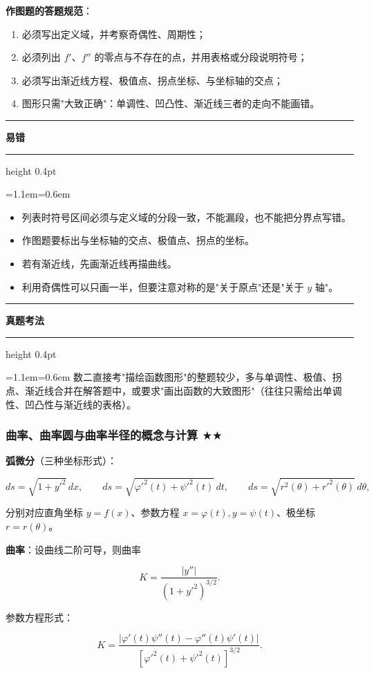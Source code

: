 \documentclass[11pt,openany,UTF8]{ctexbook}
\newcommand{\callouthead}[2]{%
  \par\addvspace{7pt}\noindent
  {\color{#1}\rule[-0.15em]{3pt}{1.05em}}\hspace{0.5em}%
  {\bfseries\color{#1}#2}\par\nobreak\vspace{-0.35em}%
  {\color{rulesep}\hrule height 0.4pt}\nobreak\vspace{0.45em}%
  \begingroup\small\setlength{\parindent}{0pt}%
  \leftskip=1.1em\rightskip=0.6em\noindent\ignorespaces}
\newcommand{\calloutend}{\par\endgroup\addvspace{7pt}}
\newenvironment{callwarn}[1]{\callouthead{warnbar}{#1}}{\calloutend}
\newenvironment{callexam}[1]{\callouthead{exambar}{#1}}{\calloutend}
\begin{document}
\textbf{作图题的答题规范}：

\begin{enumerate}
\item 必须写出定义域，并考察奇偶性、周期性；
\item 必须列出 $f'$、$f''$ 的零点与不存在的点，并用表格或分段说明符号；
\item 必须写出渐近线方程、极值点、拐点坐标、与坐标轴的交点；
\item 图形只需"大致正确"：单调性、凹凸性、渐近线三者的走向不能画错。
\end{enumerate}
\begin{callwarn}{易错}
\begin{itemize}
\item 列表时符号区间必须与定义域的分段一致，不能漏段，也不能把分界点写错。
\item 作图题要标出与坐标轴的交点、极值点、拐点的坐标。
\item 若有渐近线，先画渐近线再描曲线。
\item 利用奇偶性可以只画一半，但要注意对称的是"关于原点"还是"关于 $y$ 轴"。
\end{itemize}
\end{callwarn}

\begin{callexam}{真题考法}
数二直接考"描绘函数图形"的整题较少，多与单调性、极值、拐点、渐近线合并在解答题中，或要求"画出函数的大致图形"（往往只需给出单调性、凹凸性与渐近线的表格）。

\end{callexam}

\subsubsection{曲率、曲率圆与曲率半径的概念与计算 $\bigstar$$\bigstar$}

\textbf{弧微分}（三种坐标形式）：

\[ds=\sqrt{1+y'^2}\,dx,\qquad
ds=\sqrt{\varphi'^2(t)+\psi'^2(t)}\,dt,\qquad
ds=\sqrt{r^2(\theta)+r'^2(\theta)}\,d\theta,\]

分别对应直角坐标 $y=f(x)$、参数方程 $x=\varphi(t),y=\psi(t)$、极坐标 $r=r(\theta)$。

\textbf{曲率}：设曲线二阶可导，则曲率

\[K=\frac{|y''|}{\left(1+y'^2\right)^{3/2}}.\]

参数方程形式：

\[K=\frac{|\varphi'(t)\psi''(t)-\varphi''(t)\psi'(t)|}{\left[\varphi'^2(t)+\psi'^2(t)\right]^{3/2}}.\]
\end{document}
